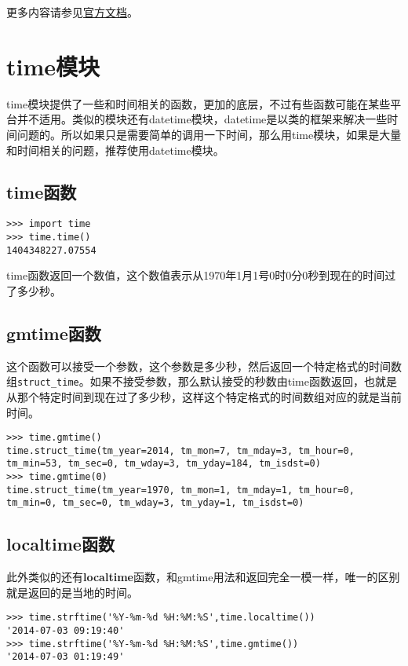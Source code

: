 \documentclass[12pt,oneside]{book}
\begin{document}
\begin{common-format}
\begin{large}
更多内容请参见\href{https://docs.python.org/3/library/shelve.html}{官方文档}。
\end{large}


\chapter{time模块}
time模块提供了一些和时间相关的函数，更加的底层，不过有些函数可能在某些平台并不适用。类似的模块还有datetime模块，datetime是以类的框架来解决一些时间问题的。所以如果只是需要简单的调用一下时间，那么用time模块，如果是大量和时间相关的问题，推荐使用datetime模块。

\section{time函数}
\begin{Verbatim}
>>> import time
>>> time.time()
1404348227.07554
\end{Verbatim}
time函数返回一个数值，这个数值表示从1970年1月1号0时0分0秒到现在的时间过了多少秒。

\section{gmtime函数}
这个函数可以接受一个参数，这个参数是多少秒，然后返回一个特定格式的时间数组\verb+struct_time+。如果不接受参数，那么默认接受的秒数由time函数返回，也就是从那个特定时间到现在过了多少秒，这样这个特定格式的时间数组对应的就是当前时间。

\begin{Verbatim}
>>> time.gmtime()
time.struct_time(tm_year=2014, tm_mon=7, tm_mday=3, tm_hour=0, 
tm_min=53, tm_sec=0, tm_wday=3, tm_yday=184, tm_isdst=0)
>>> time.gmtime(0)
time.struct_time(tm_year=1970, tm_mon=1, tm_mday=1, tm_hour=0, 
tm_min=0, tm_sec=0, tm_wday=3, tm_yday=1, tm_isdst=0)
\end{Verbatim}

\section{localtime函数}
此外类似的还有\textbf{localtime}函数，和gmtime用法和返回完全一模一样，唯一的区别就是返回的是当地的时间。
\begin{Verbatim}
>>> time.strftime('%Y-%m-%d %H:%M:%S',time.localtime())
'2014-07-03 09:19:40'
>>> time.strftime('%Y-%m-%d %H:%M:%S',time.gmtime())
'2014-07-03 01:19:49'
\end{Verbatim}



\end{common-format}
\end{document}
